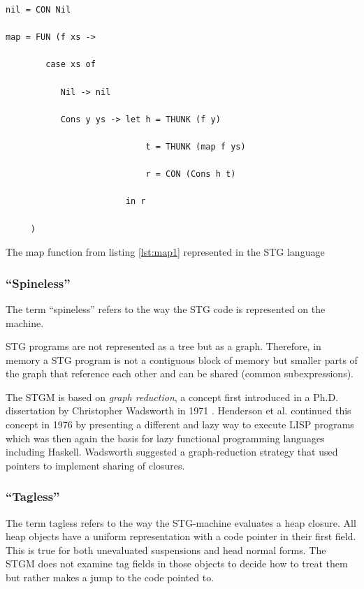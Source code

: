\documentclass[runningheads]{llncs}
\begin{document}
\begin{listing}[H]
\begin{verbatim}
nil = CON Nil

map = FUN (f xs ->

        case xs of

           Nil -> nil

           Cons y ys -> let h = THUNK (f y)

                            t = THUNK (map f ys)

                            r = CON (Cons h t)

                        in r

     )
\end{verbatim}
\caption{The map function from listing \ref{lst:map1} represented in the STG language}
\label{lst:map2}
\end{listing}

\subsubsection{\enquote{Spineless}}
The term \enquote{spineless} refers to the way the STG code is represented on the machine. 

STG programs are not represented as a tree but as a graph. Therefore, in memory a STG program is not a contiguous block of memory but smaller parts of the graph that reference each other and can be shared (common subexpressions).

The STGM is based on \textit{graph reduction}, a concept first introduced in a Ph.D. dissertation by Christopher Wadsworth in 1971 \cite{christopherwadsworth}. Henderson et al. continued this concept in 1976 by presenting a different and lazy way to execute LISP programs \cite{henderson1976lazy} which was then again the basis for lazy functional programming languages including Haskell. Wadsworth suggested a graph-reduction strategy that used pointers to implement sharing of closures.

\subsubsection{\enquote{Tagless}}
\label{sec:tagless}
The term tagless refers to the way the STG-machine evaluates a heap closure.
All heap objects have a uniform representation with a code pointer in their first field. This is true for both unevaluated suspensions and head normal forms. The STGM does not examine tag fields in those objects to decide how to treat them but rather makes a jump to the code pointed to. \cite{jones1992implementing}
\end{document}
